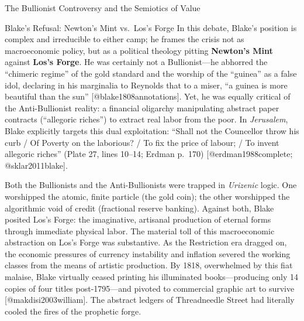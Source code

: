 \documentclass[
  ignorenonframetext,
]{beamer}
\begin{document}
\begin{frame}{The Bullionist Controversy and the Semiotics of Value}
\begin{block}{Blake's Refusal: Newton's Mint vs.~Los's Forge}
\protect{}\label{blakes-refusal-newtons-mint-vs.-loss-forge}
In this debate, Blake's position is complex and irreducible to either
camp; he frames the crisis not as macroeconomic policy, but as a
political theology pitting \textbf{Newton's Mint} against \textbf{Los's
Forge}. He was certainly not a Bullionist---he abhorred the ``chimeric
regime'' of the gold standard and the worship of the ``guinea'' as a
false idol, declaring in his marginalia to Reynolds that to a miser, ``a
guinea is more beautiful than the sun'' {[}@blake1808annotations{]}.
Yet, he was equally critical of the Anti-Bullionist reality: a financial
oligarchy manipulating abstract paper contracts (``allegoric riches'')
to extract real labor from the poor. In \emph{Jerusalem}, Blake
explicitly targets this dual exploitation: ``Shall not the Councellor
throw his curb / Of Poverty on the laborious? / To fix the price of
labour; / To invent allegoric riches'' (Plate 27, lines 10--14; Erdman
p.~170) {[}@erdman1988complete; @sklar2011blake{]}.

Both the Bullionists and the Anti-Bullionists were trapped in
\emph{Urizenic} logic. One worshipped the atomic, finite particle (the
gold coin); the other worshipped the algorithmic void of credit
(fractional reserve banking). Against both, Blake posited Los's Forge:
the imaginative, artisanal production of eternal forms through immediate
physical labor. The material toll of this macroeconomic abstraction on
Los's Forge was substantive. As the Restriction era dragged on, the
economic pressures of currency instability and inflation severed the
working classes from the means of artistic production. By 1818,
overwhelmed by this fiat malaise, Blake virtually ceased printing his
illuminated books---producing only 14 copies of four titles
post-1795---and pivoted to commercial graphic art to survive
{[}@makdisi2003william{]}. The abstract ledgers of Threadneedle Street
had literally cooled the fires of the prophetic forge.


\end{block}
\end{frame}
\end{document}
